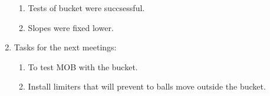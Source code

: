 \begin{enumerate}
\begin{enumerate}
	  \item Tests of bucket were succsessful.
	  
	  \item Slopes were fixed lower.
	  
    \end{enumerate}
    
	\item Tasks for the next meetings:
	\begin{enumerate}
	  \item To test MOB with the bucket.
	  
	  \item Install limiters that will prevent to balls move outside the bucket.
	  	  
    \end{enumerate}     
\end{enumerate}
\fillpage